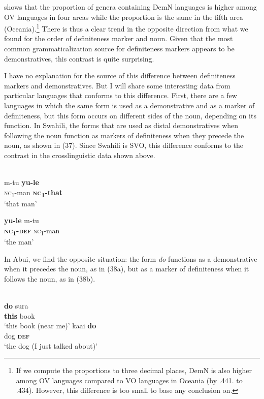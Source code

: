 \documentclass[output=paper]{langsci/langscibook}
\begin{document}
 shows that the proportion of genera containing DemN languages is higher among OV languages in four areas while the proportion is the same in the fifth area (Oceania).\footnote{If we compute the proportions to three decimal places, DemN is also higher among OV languages compared to VO languages in Oceania (by .441. to .434). However, this difference is too small to base any conclusion on.} There is thus a clear trend in the opposite direction from what we found for the order of definiteness marker and noun. Given that the most common grammaticalization source for definiteness markers appears to be demonstratives, this contrast is quite surprising.

I have no explanation for the source of this difference between definiteness markers and demonstratives. But I will share some interesting data from particular languages that conforms to this difference. First, there are a few languages in which the same form is used as a demonstrative and as a marker of definiteness, but this form occurs on different sides of the noun, depending on its function. In Swahili, the forms that are used as distal demonstratives when following the noun function as markers of definiteness when they precede the noun, as shown in (37). Since Swahili is SVO, this difference conforms to the contrast in the crosslinguistic data shown above.

\ea
{}\\
\ea \gll  m-tu  \textbf{yu-le}\\
         \textsc{nc}\textsubscript{1}{}-man  \textbf{\textsc{nc}}\textbf{\textsubscript{1}}\textbf{{}-that}\\
\glt     ‘that man’

\ex
\gll    \textbf{yu-le}  m-tu\\
         \textbf{\textsc{nc}}\textbf{\textsubscript{1}}\textbf{{}-}\textbf{\textsc{def}}  \textsc{nc}\textsubscript{1}{}-man\\
\glt     ‘the man’
\z
\z

In Abui, we find the opposite situation: the form \textit{do} functions as a demonstrative when it precedes the noun, as in (38a), but as a marker of definiteness when it follows the noun, as in (38b).

\ea\label{ex:dryer:}
\\
\ea
\gll     \textbf{do}  sura  \\  
         \textbf{this}  book\\    
\glt     ‘this book (near me)’  
\ex  kaai  \textbf{do}\\
    dog  \textbf{\textsc{def}}\\
  ‘the dog (I just talked about)’
\z
\z
\end{document}
